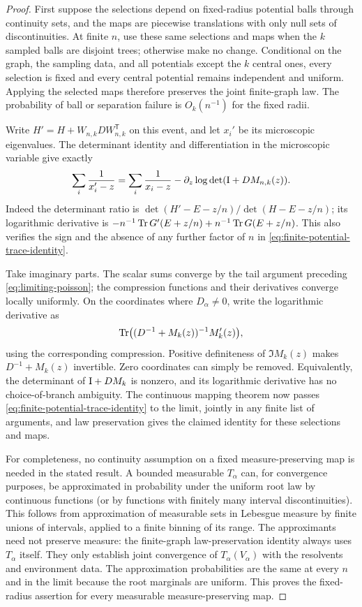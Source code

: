 \begin{proof}
First suppose the selections depend on fixed-radius potential balls
through continuity sets, and the maps are piecewise translations
with only null sets of discontinuities. At finite $n$, use these
same selections and maps when the $k$ sampled balls are disjoint
trees; otherwise make no change. Conditional on the graph, the
sampling data, and all potentials except the $k$ central ones,
every selection is fixed and every central potential remains
independent and uniform. Applying the selected maps therefore
preserves the joint finite-graph law. The probability of ball or
separation failure is $O_k(n^{-1})$ for the fixed radii.

Write $H'=H+W_{n,k}D W_{n,k}^{\mathsf T}$ on this event, and
let $x_i'$ be its microscopic eigenvalues. The determinant identity
and differentiation in the microscopic variable give exactly
\begin{equation}\label{eq:finite-potential-trace-identity}
 \sum_i\frac1{x_i'-z}
   =\sum_i\frac1{x_i-z}
                  -\partial_z\log\det(\mathrm I+D M_{n,k}(z)).
\end{equation}
Indeed the determinant ratio is
$\det(H'-E-z/n)/\det(H-E-z/n)$; its logarithmic derivative is
$-n^{-1}\operatorname{Tr} G'(E+z/n)+n^{-1}\operatorname{Tr} G(E+z/n)$.
This also verifies the sign and the absence of any further factor
of $n$ in \eqref{eq:finite-potential-trace-identity}.

Take imaginary parts. The scalar sums converge by the tail argument
preceding \eqref{eq:limiting-poisson}; the compression functions and
their derivatives converge locally uniformly. On the coordinates
where $D_\alpha\ne0$, write the logarithmic derivative as
\begin{equation}\label{eq:switch-log-derivative}
 \operatorname{Tr}\bigl((D^{-1}+M_k(z))^{-1}M_k'(z)\bigr),
\end{equation}
using the corresponding compression. Positive definiteness of
$\Im M_k(z)$ makes $D^{-1}+M_k(z)$ invertible. Zero coordinates
can simply be removed. Equivalently, the determinant of
$\mathrm I+D M_k$ is nonzero, and its logarithmic derivative has no
choice-of-branch ambiguity. The continuous mapping theorem now
passes \eqref{eq:finite-potential-trace-identity} to the limit,
jointly in any finite list of arguments, and law preservation gives
the claimed identity for these selections and maps.

For completeness, no continuity assumption on a fixed
measure-preserving map is needed in the stated result. A bounded
measurable $T_\alpha$ can, for convergence purposes, be approximated
in probability under the uniform root law by continuous functions
(or by functions with finitely many interval discontinuities).
This follows from approximation of measurable sets in Lebesgue
measure by finite unions of intervals, applied to a finite binning
of its range. The approximants need not preserve measure: the
finite-graph law-preservation identity always uses $T_\alpha$
itself. They only establish joint convergence of
$T_\alpha(V_\alpha)$ with the resolvents and environment data.
The approximation probabilities are the same at every $n$ and in
the limit because the root marginals are uniform. This proves the
fixed-radius assertion for every measurable measure-preserving map.


\end{proof}
